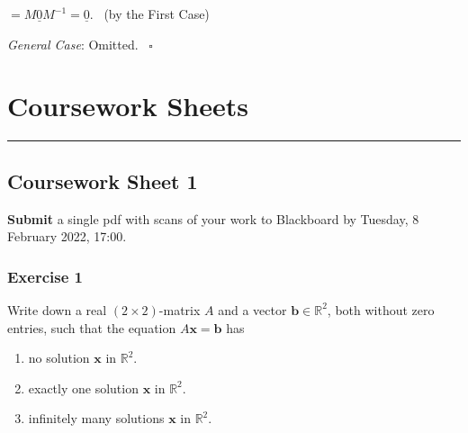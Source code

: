 \documentclass[
  12pt,
  a4paper,
  twoside]{article}
\theoremstyle{plain}
\theoremstyle{definition}
\begin{document}
\hspace*{0.333em}\hspace*{0.333em}\hspace*{0.333em}\hspace*{0.333em}\hspace*{0.333em}\hspace*{0.333em}\hspace*{0.333em}\hspace*{0.333em}\hspace*{0.333em}\hspace*{0.333em}\hspace*{0.333em}\hspace*{0.333em} \(= M \underline{0} M^{-1} = \underline{0}\). \hfill~{(by the First Case)}

\emph{General Case}: Omitted.
\hfill~{\(\square\)}

\newpage

\hypertarget{courseworks}{%
\section{Coursework Sheets}\label{courseworks}}

\begin{center}\rule{0.5\linewidth}{0.5pt}\end{center}

\hypertarget{coursework-sheet-1}{%
\subsection{Coursework Sheet 1}\label{coursework-sheet-1}}

\textbf{Submit} a single pdf with scans of your work to Blackboard by Tuesday, 8 February 2022, 17:00.

\hypertarget{exercise-1}{%
\subsubsection*{Exercise 1}\label{exercise-1}}

Write down a real \((2\times 2)\)-matrix \(A\) and a vector \(\mathbf{b} \in \mathbb{R}^2\), both without zero entries, such that the equation \(A\mathbf{x} = \mathbf{b}\) has

\begin{enumerate}
\def\labelenumi{(\alph{enumi})}
\item
  no solution \(\mathbf{x}\) in \(\mathbb{R}^2\).
\item
  exactly one solution \(\mathbf{x}\) in \(\mathbb{R}^2\).
\item
  infinitely many solutions \(\mathbf{x}\) in \(\mathbb{R}^2\).
\end{enumerate}
\end{document}
